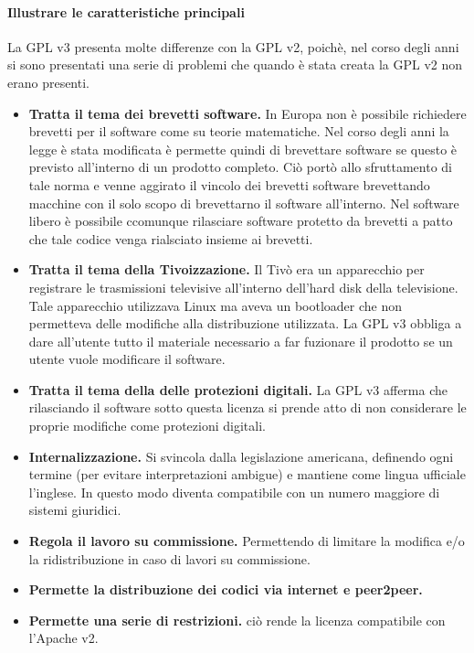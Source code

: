 \documentclass[a4paper]{article}
\begin{document}
			\paragraph{Illustrare le caratteristiche principali}
			La GPL v3 presenta molte differenze con la GPL v2, poichè, nel corso degli anni si sono presentati una serie di problemi che quando è stata creata la GPL v2 non erano presenti.
			\begin{itemize}
				\item \textbf{Tratta il tema dei brevetti software.} In Europa non è possibile richiedere brevetti per il software come su teorie matematiche. Nel corso degli anni la legge è stata modificata è permette quindi di brevettare software se questo è previsto all'interno di un prodotto completo. Ciò portò allo sfruttamento di tale norma e venne aggirato il vincolo dei brevetti software brevettando macchine con il solo scopo di brevettarno il software all'interno. Nel software libero è possibile ccomunque rilasciare software protetto da brevetti a patto che tale codice venga rialsciato insieme ai brevetti.
				\item \textbf{Tratta il tema della Tivoizzazione.} Il Tivò era un apparecchio per registrare le trasmissioni televisive all'interno dell'hard disk della televisione. Tale apparecchio utilizzava Linux ma aveva un bootloader che non permetteva delle modifiche alla distribuzione utilizzata. La GPL v3 obbliga a dare all'utente tutto il materiale necessario a far fuzionare il prodotto se un utente vuole modificare il software.
				\item \textbf{Tratta il tema della delle protezioni digitali.} La GPL v3 afferma che rilasciando il software sotto questa licenza si prende atto di non considerare le proprie modifiche come protezioni digitali.
				\item \textbf{Internalizzazione.} Si svincola dalla legislazione americana, definendo ogni termine (per evitare interpretazioni ambigue) e mantiene come lingua ufficiale l'inglese. In questo modo diventa compatibile con un numero maggiore di sistemi giuridici.
				\item \textbf{Regola il lavoro su commissione.} Permettendo di limitare la modifica e/o la ridistribuzione in caso di lavori su commissione.
				\item \textbf{Permette la distribuzione dei codici via internet e peer2peer.}
				\item \textbf{Permette una serie di restrizioni.} ciò rende la licenza compatibile con l'Apache v2.

			\end{itemize}
		
\end{document}
